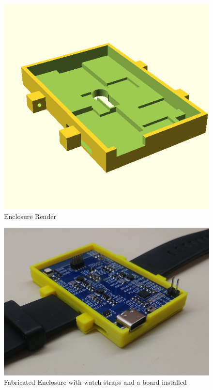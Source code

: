 \begin{figure}[!htb]
\centering
\includegraphics[width=\textwidth,height=\textheight,keepaspectratio]{images/enclosure.png}
\caption{Enclosure Render}
\label{fig:enclosure}
\end{figure}

\begin{figure}[!htb]
\centering
\includegraphics[width=\textwidth,height=\textheight,keepaspectratio]{images/biosense.jpg}
\caption{Fabricated Enclosure with watch straps and a board installed}
\label{fig:enclosure-fab}
\end{figure}
